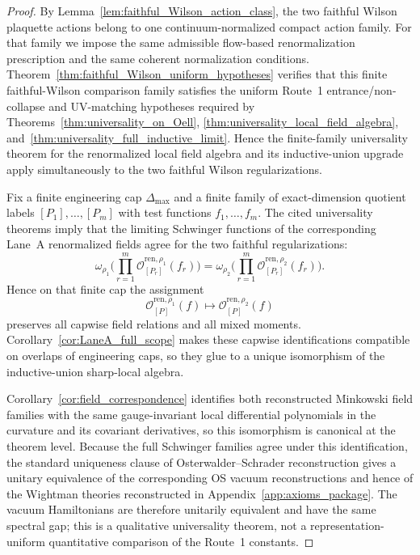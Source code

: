 \begin{proof}
By Lemma~\ref{lem:faithful_Wilson_action_class}, the two faithful Wilson plaquette actions belong to one continuum-normalized compact action family. For that family we impose the same admissible flow-based renormalization prescription and the same coherent normalization conditions. Theorem~\ref{thm:faithful_Wilson_uniform_hypotheses} verifies that this finite faithful-Wilson comparison family satisfies the uniform Route~1 entrance/non-collapse and UV-matching hypotheses required by Theorems~\ref{thm:universality_on_Oell}, \ref{thm:universality_local_field_algebra}, and~\ref{thm:universality_full_inductive_limit}. Hence the finite-family universality theorem for the renormalized local field algebra and its inductive-union upgrade apply simultaneously to the two faithful Wilson regularizations.

Fix a finite engineering cap $\Delta_{\max}$ and a finite family of exact-dimension quotient labels $[P_1],\dots,[P_m]$ with test functions $f_1,\dots,f_m$. The cited universality theorems imply that the limiting Schwinger functions of the corresponding Lane~A renormalized fields agree for the two faithful regularizations:
\[
\omega_{\rho_1}\!\Big(\prod_{r=1}^m \mathcal O^{\mathrm{ren},\rho_1}_{[P_r]}(f_r)\Big)
=
\omega_{\rho_2}\!\Big(\prod_{r=1}^m \mathcal O^{\mathrm{ren},\rho_2}_{[P_r]}(f_r)\Big).
\]
Hence on that finite cap the assignment
\[
\mathcal O^{\mathrm{ren},\rho_1}_{[P]}(f)\longmapsto \mathcal O^{\mathrm{ren},\rho_2}_{[P]}(f)
\]
preserves all capwise field relations and all mixed moments. Corollary~\ref{cor:LaneA_full_scope} makes these capwise identifications compatible on overlaps of engineering caps, so they glue to a unique isomorphism of the inductive-union sharp-local algebra.

Corollary~\ref{cor:field_correspondence} identifies both reconstructed Minkowski field families with the same gauge-invariant local differential polynomials in the curvature and its covariant derivatives, so this isomorphism is canonical at the theorem level. Because the full Schwinger families agree under this identification, the standard uniqueness clause of Osterwalder--Schrader reconstruction gives a unitary equivalence of the corresponding OS vacuum reconstructions and hence of the Wightman theories reconstructed in Appendix~\ref{app:axioms_package}. The vacuum Hamiltonians are therefore unitarily equivalent and have the same spectral gap; this is a qualitative universality theorem, not a representation-uniform quantitative comparison of the Route~1 constants.
\end{proof}

